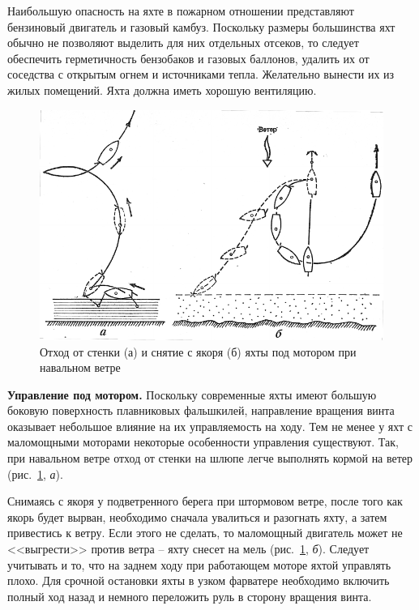 \documentclass[a4paper, 12pt, twoside, final, book, russian, fittopage, cyremdash]{ncc}
\newcommand{\ris}[1]{\ref{fig:#1}}
\begin{document}
Наибольшую опасность на яхте в пожарном отношении представляют бензиновый двигатель и газовый камбуз. Поскольку размеры большинства яхт обычно не позволяют выделить для них отдельных отсеков, то следует обеспечить герметичность бензобаков и газовых баллонов, удалить их от соседства с открытым огнем и источниками тепла. Желательно вынести их из жилых помещений. Яхта должна иметь хорошую вентиляцию. 

\begin{figure}[htb]
  \centering{}
  \includegraphics[scale=1.3]{0143P}
  \caption{Отход от стенки (а) и снятие с якоря (б) яхты под мотором при навальном ветре}
  \label{fig:143}
\end{figure}

\textbf{Управление под мотором.} Поскольку современные яхты имеют большую боковую поверхность плавниковых фальшкилей, направление вращения винта оказывает небольшое влияние на их управляемость на ходу. Тем не менее у яхт с маломощными моторами некоторые особенности управления существуют. Так, при навальном ветре отход от стенки на шлюпе  легче выполнять кормой на ветер (рис.~\ris{143}, \textit{а}).

Снимаясь с якоря у подветренного берега при штормовом ветре, после того как якорь будет вырван, необходимо сначала увалиться и разогнать яхту, а затем привестись к ветру. Если этого не сделать, то маломощный двигатель может не <<выгрести>> против ветра \--- яхту снесет на мель (рис.~\ris{143}, \textit{б}). Следует учитывать и то, что на заднем ходу при работающем моторе яхтой управлять плохо.
Для срочной остановки яхты в узком фарватере необходимо включить полный ход назад и немного переложить руль в сторону вращения винта. 
\end{document}
